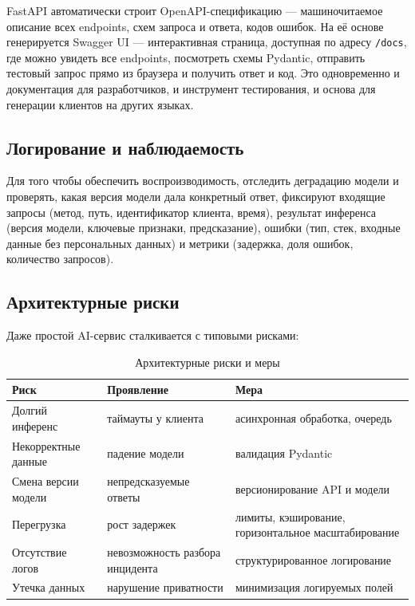 \documentclass[12pt,a4paper]{article}
\begin{document}
FastAPI автоматически строит OpenAPI-спецификацию — машиночитаемое описание всех endpoints, схем запроса и ответа, кодов ошибок. На её основе генерируется Swagger UI — интерактивная страница, доступная по адресу \texttt{/docs}, где можно увидеть все endpoints, посмотреть схемы Pydantic, отправить тестовый запрос прямо из браузера и получить ответ и код. Это одновременно и документация для разработчиков, и инструмент тестирования, и основа для генерации клиентов на других языках.

\subsection{Логирование и наблюдаемость}

Для того чтобы обеспечить воспроизводимость, отследить деградацию модели и проверять, какая версия модели дала конкретный ответ, фиксируют входящие запросы (метод, путь, идентификатор клиента, время), результат инференса (версия модели, ключевые признаки, предсказание), ошибки (тип, стек, входные данные без персональных данных) и метрики (задержка, доля ошибок, количество запросов).

\subsection{Архитектурные риски}

Даже простой AI-сервис сталкивается с типовыми рисками:

\begin{table}[H]
\centering
\caption{Архитектурные риски и меры}
\label{tab:risks}
\begin{tabular}{|p{4cm}|p{5cm}|p{5cm}|}
\hline
\textbf{Риск} & \textbf{Проявление} & \textbf{Мера} \\
\hline
Долгий инференс & таймауты у клиента & асинхронная обработка, очередь \\
Некорректные данные & падение модели & валидация Pydantic \\
Смена версии модели & непредсказуемые ответы & версионирование API и модели \\
Перегрузка & рост задержек & лимиты, кэширование, горизонтальное масштабирование \\
Отсутствие логов & невозможность разбора инцидента & структурированное логирование \\
Утечка данных & нарушение приватности & минимизация логируемых полей \\
\hline
\end{tabular}
\end{table}
\end{document}
